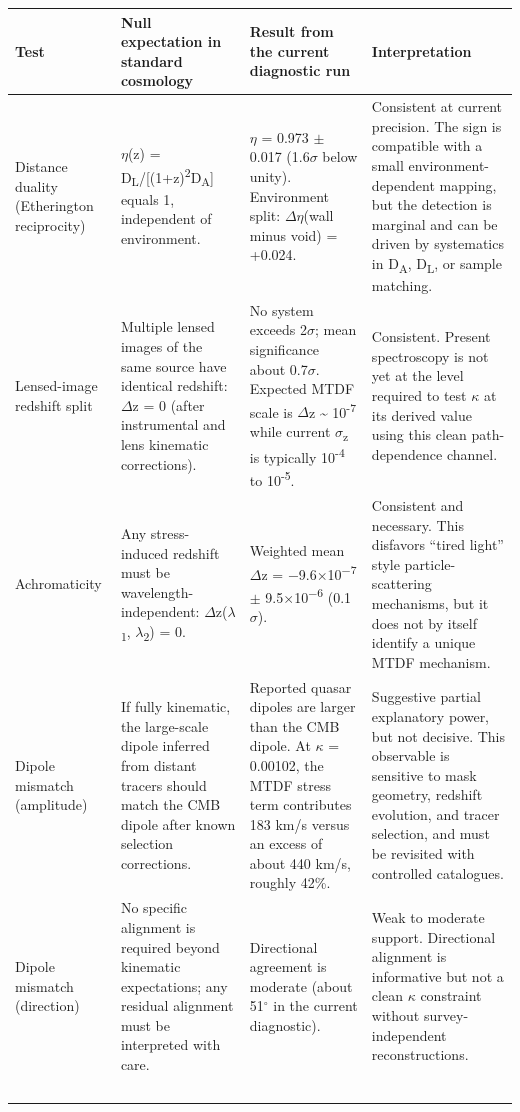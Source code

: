 \documentclass[11pt,a4paper]{article}
\begin{document}
\begin{table}[H]
\centering
\footnotesize
\begin{tabularx}{\linewidth}{l>{\RaggedRight\arraybackslash}X>{\RaggedRight\arraybackslash}X>{\RaggedRight\arraybackslash}X}
\toprule
\textbf{Test} & \textbf{Null expectation in standard cosmology} & \textbf{Result from the current diagnostic run} & \textbf{Interpretation} \tabularnewline
\midrule
Distance duality (Etherington reciprocity) & $\eta$(z) = D\textsubscript{L}/[(1+z)\textsuperscript{2}D\textsubscript{A}] equals 1, independent of environment. & $\eta$ = 0.973 $\pm$ 0.017 (1.6$\sigma$ below unity). Environment split: $\Delta$$\eta$(wall minus void) = +0.024. & Consistent at current precision. The sign is compatible with a small environment-dependent mapping, but the detection is marginal and can be driven by systematics in D\textsubscript{A}, D\textsubscript{L}, or sample matching. \tabularnewline
Lensed-image redshift split & Multiple lensed images of the same source have identical redshift: $\Delta$z = 0 (after instrumental and lens kinematic corrections). & No system exceeds 2$\sigma$; mean significance about 0.7$\sigma$. Expected MTDF scale is $\Delta$z \~{} 10\textsuperscript{-7} while current $\sigma$\textsubscript{z} is typically 10\textsuperscript{-4} to 10\textsuperscript{-5}. & Consistent. Present spectroscopy is not yet at the level required to test $\kappa$ at its derived value using this clean path-dependence channel. \tabularnewline
Achromaticity & Any stress-induced redshift must be wavelength-independent: $\Delta$z($\lambda$\textsubscript{1}, $\lambda$\textsubscript{2}) = 0. & Weighted mean $\Delta$z = $-$9.6$\times$10\textsuperscript{$-$7} $\pm$ 9.5$\times$10\textsuperscript{$-$6} (0.1$\sigma$). & Consistent and necessary. This disfavors ``tired light'' style particle-scattering mechanisms, but it does not by itself identify a unique MTDF mechanism. \tabularnewline
Dipole mismatch (amplitude) & If fully kinematic, the large-scale dipole inferred from distant tracers should match the CMB dipole after known selection corrections. & Reported quasar dipoles are larger than the CMB dipole. At $\kappa$ = 0.00102, the MTDF stress term contributes 183 km/\allowbreak{}s versus an excess of about 440 km/\allowbreak{}s, roughly 42\%. & Suggestive partial explanatory power, but not decisive. This observable is sensitive to mask geometry, redshift evolution, and tracer selection, and must be revisited with controlled catalogues. \tabularnewline
Dipole mismatch (direction) & No specific alignment is required beyond kinematic expectations; any residual alignment must be interpreted with care. & Directional agreement is moderate (about 51$^{\circ}$ in the current diagnostic). & Weak to moderate support. Directional alignment is informative but not a clean $\kappa$ constraint without survey-independent reconstructions. \tabularnewline
$$
\end{tabularx}
\end{table}
\end{document}
